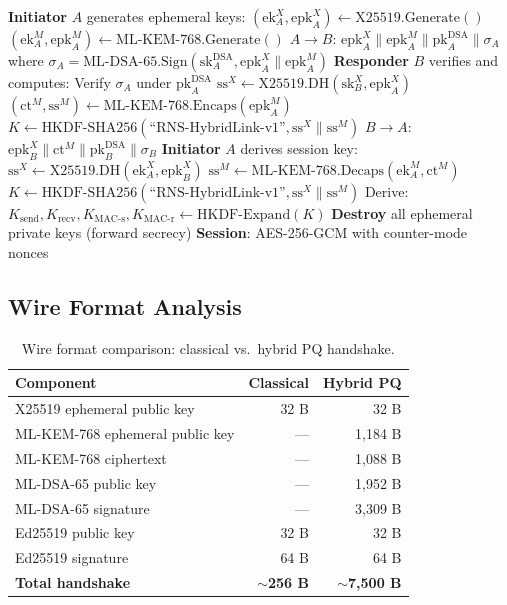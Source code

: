 \documentclass[11pt,letterpaper]{article}
\begin{document}
\begin{algorithm}[H]
\caption{RNS Hybrid Post-Quantum Key Exchange}
\begin{algorithmic}[1]
\State \textbf{Initiator} $A$ generates ephemeral keys:
\State \quad $(\text{ek}_A^{X}, \text{epk}_A^{X}) \gets \text{X25519.Generate}()$
\State \quad $(\text{ek}_A^{M}, \text{epk}_A^{M}) \gets \text{ML-KEM-768.Generate}()$
\State $A \to B$: $\text{epk}_A^{X} \| \text{epk}_A^{M} \| \text{pk}_A^{\text{DSA}} \| \sigma_A$
\State \quad where $\sigma_A = \text{ML-DSA-65.Sign}(\text{sk}_A^{\text{DSA}}, \text{epk}_A^{X} \| \text{epk}_A^{M})$
\Statex
\State \textbf{Responder} $B$ verifies and computes:
\State \quad Verify $\sigma_A$ under $\text{pk}_A^{\text{DSA}}$
\State \quad $\text{ss}^{X} \gets \text{X25519.DH}(\text{sk}_B^{X}, \text{epk}_A^{X})$
\State \quad $(\text{ct}^{M}, \text{ss}^{M}) \gets \text{ML-KEM-768.Encaps}(\text{epk}_A^{M})$
\State \quad $K \gets \text{HKDF-SHA256}(\text{``RNS-HybridLink-v1''}, \text{ss}^{X} \| \text{ss}^{M})$
\State $B \to A$: $\text{epk}_B^{X} \| \text{ct}^{M} \| \text{pk}_B^{\text{DSA}} \| \sigma_B$
\Statex
\State \textbf{Initiator} $A$ derives session key:
\State \quad $\text{ss}^{X} \gets \text{X25519.DH}(\text{ek}_A^{X}, \text{epk}_B^{X})$
\State \quad $\text{ss}^{M} \gets \text{ML-KEM-768.Decaps}(\text{ek}_A^{M}, \text{ct}^{M})$
\State \quad $K \gets \text{HKDF-SHA256}(\text{``RNS-HybridLink-v1''}, \text{ss}^{X} \| \text{ss}^{M})$
\State \quad Derive: $K_{\text{send}}, K_{\text{recv}}, K_{\text{MAC-s}}, K_{\text{MAC-r}} \gets \text{HKDF-Expand}(K)$
\State \textbf{Destroy} all ephemeral private keys (forward secrecy)
\State \textbf{Session}: AES-256-GCM with counter-mode nonces
\end{algorithmic}
\end{algorithm}

\subsection{Wire Format Analysis}

\begin{table}[H]
\centering
\begin{tabular}{@{}lrr@{}}
\toprule
\textbf{Component} & \textbf{Classical} & \textbf{Hybrid PQ} \\
\midrule
X25519 ephemeral public key & 32 B & 32 B \\
ML-KEM-768 ephemeral public key & --- & 1,184 B \\
ML-KEM-768 ciphertext & --- & 1,088 B \\
ML-DSA-65 public key & --- & 1,952 B \\
ML-DSA-65 signature & --- & 3,309 B \\
Ed25519 public key & 32 B & 32 B \\
Ed25519 signature & 64 B & 64 B \\
\midrule
\textbf{Total handshake} & \textbf{$\sim$256 B} & \textbf{$\sim$7,500 B} \\
\bottomrule
\end{tabular}
\caption{Wire format comparison: classical vs.\ hybrid PQ handshake.}
\label{tab:wireformat}
\end{table}
\end{document}
